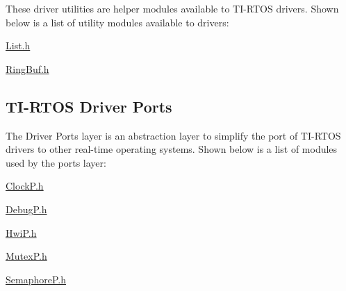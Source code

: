 These driver utilities are helper modules available to T\+I-\/\+R\+T\+O\+S drivers. Shown below is a list of utility modules available to drivers\+:
\begin{DoxyItemize}
\item \hyperlink{_list_8h}{List.\+h}
\item \hyperlink{_ring_buf_8h}{Ring\+Buf.\+h}
\end{DoxyItemize}\hypertarget{index_ports}{}\subsection{T\+I-\/\+R\+T\+O\+S Driver Ports}\label{index_ports}
The Driver Ports layer is an abstraction layer to simplify the port of T\+I-\/\+R\+T\+O\+S drivers to other real-\/time operating systems. Shown below is a list of modules used by the ports layer\+:
\begin{DoxyItemize}
\item \hyperlink{_clock_p_8h}{Clock\+P.\+h}
\item \hyperlink{_debug_p_8h}{Debug\+P.\+h}
\item \hyperlink{_hwi_p_8h}{Hwi\+P.\+h}
\item \hyperlink{_mutex_p_8h}{Mutex\+P.\+h}
\item \hyperlink{_semaphore_p_8h}{Semaphore\+P.\+h} 
\end{DoxyItemize}